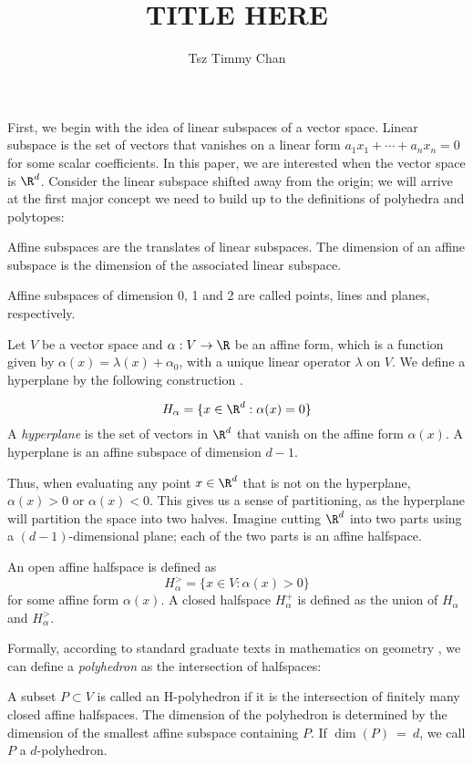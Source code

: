 \documentclass{TC}
\title{TITLE HERE}	%
\author{Tsz Timmy Chan}	%
\begin{document}
First, we begin with the idea of linear subspaces of a vector space. Linear subspace is the set of vectors that vanishes on a linear form $a_1 x_1 + \cdots + a_nx_n = 0$ for some scalar coefficients. In this paper, we are interested when the vector space is $\R^d$. Consider the linear subspace shifted away from the origin; we will arrive at the first major concept we need to build up to the definitions of polyhedra and polytopes: 

\begin{definition}
Affine subspaces are the translates of linear subspaces. The dimension of an affine subspace is the dimension of the associated linear subspace. 
\end{definition}
Affine subspaces of dimension 0, 1 and 2 are called points, lines and planes, respectively.

Let $V$ be a vector space and $\alpha : V \to \R$ be an affine form, which is a function given by $\alpha(x) = \lambda(x) + \alpha_0$, with a unique linear operator $\lambda$ on $V$. We define a hyperplane by the following construction \cite{GubeladzePolytopesRingsKtheory}.

\begin{definition}
 $$H_\alpha = \{x \in \R^d: \alpha (x) = 0\}$$ A \emph{hyperplane} is the set of vectors in $\R^d$ that vanish on the affine form $\alpha(x)$. A hyperplane is an affine subspace of dimension $d-1$.
 \end{definition}
 
 Thus, when evaluating any point $x \in \R^d$ that is not on the hyperplane, $\alpha(x) > 0$ or $\alpha(x) < 0$. This gives us a sense of partitioning, as the hyperplane will partition the space into two halves.
  Imagine cutting $\R^d$ into two parts using a $(d-1)$-dimensional plane; each of the two parts is an affine halfspace. 

  \begin{definition} An open affine halfspace is defined as $$H_\alpha^> = \{ x \in V : \alpha (x) >0\}$$ for some affine form $\alpha(x)$. A closed halfspace $H_\alpha^+$ is defined as the union of $H_\alpha$ and $H_\alpha^>$. \end{definition}
 
 Formally, according to standard graduate texts in mathematics on geometry \cite{GubeladzePolytopesRingsKtheory, Ziegler}, we can define a \emph{polyhedron} as the intersection of halfspaces:
 
\begin{definition}[H-Polyhedron]  A subset $P \subset V$ is called an H-polyhedron if it is the intersection of finitely many closed affine halfspaces. The dimension of the polyhedron is determined by the dimension of the smallest affine subspace containing $P$. If $\dim(P)~=~d$, we call $P$ a $d$-polyhedron.

\end{definition}
\end{document}
